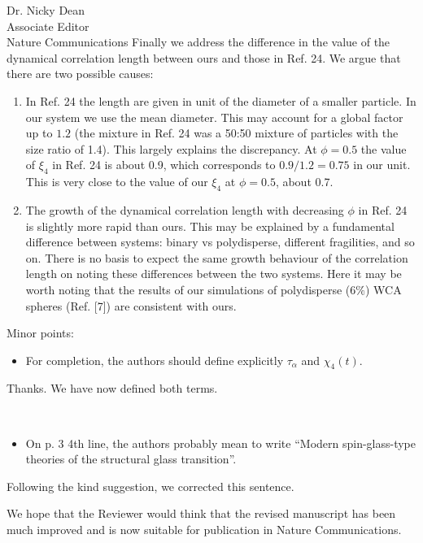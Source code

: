 \documentclass[a4paper, rebuttal, parskip=true, firsthead=false, fromemail=true, foldmarks=false]{scrlttr2}
\begin{document}
\begin{letter}{Dr. Nicky Dean\\
Associate Editor\\
Nature Communications}
Finally we address the difference in the value of the dynamical correlation length between ours and those in Ref. 24. 
We argue that there are two possible causes:
\begin{enumerate}
\item In Ref. 24 the length are given in unit of the diameter of a smaller particle. In our system we use the mean diameter. This may account for a global factor up to $1.2$ (the mixture in Ref. 24 was a 50:50 mixture of particles with the size ratio of 1.4). This largely explains the discrepancy. At $\phi=0.5$ the value of $\xi_4$ in Ref. 24 is about 0.9, 
which corresponds to $0.9/1.2=0.75$ in our unit. This is very close to the value of our $\xi_4$ at $\phi=0.5$, about 0.7.   
\item The growth of the dynamical correlation length with decreasing $\phi$ in Ref. 24 is slightly more rapid than ours. 
This may be explained by a fundamental difference between systems: binary vs polydisperse, different fragilities, and so on. 
There is no basis to expect the same growth behaviour of the correlation length on noting these differences between the two systems. 
Here it may be worth noting that the results of our simulations of polydisperse ($6\%$) WCA spheres (Ref. [7]) are consistent with ours. 
\end{enumerate} 


\begin{quotationi}
Minor points:
\begin{itemize}
\item For completion, the authors should define explicitly $\tau_\alpha$ and $\chi_4(t)$.
\end{itemize}
\end{quotationi}
Thanks. We have now defined both terms.

\begin{quotationi}
~
\begin{itemize}
\item On p. 3 4th line, the authors probably mean to write ``Modern spin-glass-type theories of the structural glass transition''.
\end{itemize}
\end{quotationi}
Following the kind suggestion, we corrected this sentence.

We hope that the Reviewer would think that the revised manuscript has been much improved and is now suitable for publication in Nature Communications. 
 
\clearpage


\end{letter}
\end{document}
